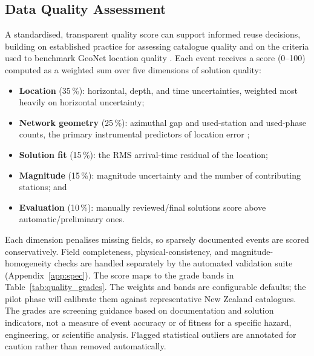 \documentclass[11pt]{article}
\begin{document}
\subsection{Data Quality Assessment}
\label{sec:quality}
A standardised, transparent quality score can support informed reuse decisions, building on established practice for assessing catalogue quality \citep{Woessner2005} and on the criteria used to benchmark GeoNet location quality \citep{WarrenSmith2025}. Each event receives a score (0--100) computed as a weighted sum over five dimensions of solution quality:
\begin{itemize}
\setlength{\itemsep}{1pt}
\item \textbf{Location} (35\,\%): horizontal, depth, and time uncertainties, weighted most heavily on horizontal uncertainty;
\item \textbf{Network geometry} (25\,\%): azimuthal gap and used-station and used-phase counts, the primary instrumental predictors of location error \citep{Bondar2004, WarrenSmith2025};
\item \textbf{Solution fit} (15\,\%): the RMS arrival-time residual of the location;
\item \textbf{Magnitude} (15\,\%): magnitude uncertainty and the number of contributing stations; and
\item \textbf{Evaluation} (10\,\%): manually reviewed/final solutions score above automatic/preliminary ones.
\end{itemize}
Each dimension penalises missing fields, so sparsely documented events are scored conservatively. Field completeness, physical-consistency, and magnitude-homogeneity checks are handled separately by the automated validation suite (Appendix~\ref{app:spec}). The score maps to the grade bands in Table~\ref{tab:quality_grades}. The weights and bands are configurable defaults; the pilot phase will calibrate them against representative New Zealand catalogues. The grades are screening guidance based on documentation and solution indicators, not a measure of event accuracy or of fitness for a specific hazard, engineering, or scientific analysis. Flagged statistical outliers are annotated for caution rather than removed automatically.
\end{document}
